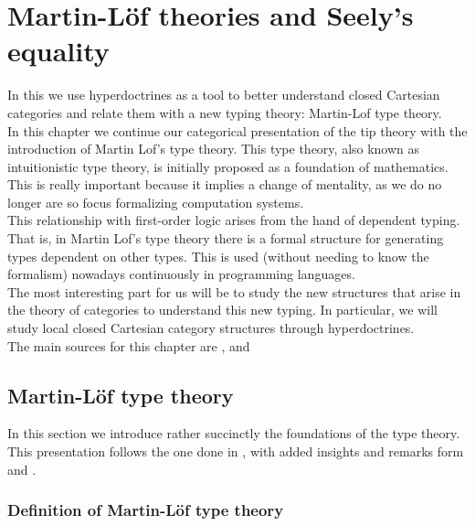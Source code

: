 
\chapter{Martin-L\"of theories and Seely's equality}
\label{chap:5}
\thispagestyle{empty}

 In this we use hyperdoctrines as a tool to better understand closed Cartesian categories and relate them with a new typing theory: Martin-Lof type theory.\\

 In this chapter we continue our categorical presentation of the tip theory with the introduction of Martin Lof's type theory. This type theory, also known as intuitionistic type theory, is initially proposed as a foundation of mathematics. This is really important because it implies a change of mentality, as we do no longer are so focus formalizing computation systems. \\

This relationship with first-order logic arises from the hand of dependent typing. That is, in Martin Lof's type theory there is a formal structure for generating types dependent on other types. This is used (without needing to know the formalism) nowadays continuously in programming languages. \\

The most interesting part for us will be to study the new structures that arise in the theory of categories to understand this new typing. In particular, we will study local closed Cartesian category structures through hyperdoctrines. \\

The main sources for this chapter are  \cite{seely1984locally}, \cite{martinlof1973intuitionistic}  and \cite{mac2013categories}



\section{Martin-Löf type theory}

In this section we introduce rather succinctly the foundations of the type theory. This presentation follows the one done in \cite{seely1984locally}, with added insights and remarks form \cite{martinlof1973intuitionistic} and \cite{sep-type-theory-intuitionistic}.



\subsection{Definition of Martin-L\"of type theory}

